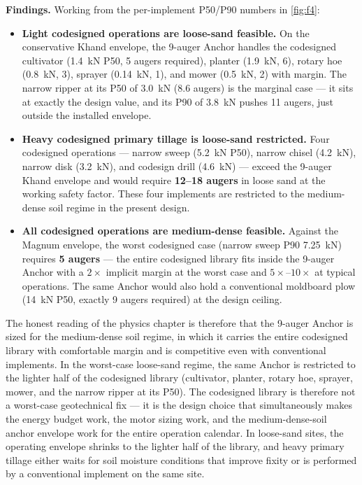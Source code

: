 \documentclass[11pt,a4paper]{article}
\begin{document}
\textbf{Findings.} Working from the per-implement P50/P90 numbers in \cref{fig:f4}:
\begin{itemize}[leftmargin=1.6em,itemsep=0.15em]
    \item \textbf{Light codesigned operations are loose-sand feasible.} On the conservative Khand envelope, the 9-auger Anchor handles the codesigned cultivator (\SI{1.4}{\kilo\newton} P50, 5 augers required), planter (\SI{1.9}{\kilo\newton}, 6), rotary hoe (\SI{0.8}{\kilo\newton}, 3), sprayer (\SI{0.14}{\kilo\newton}, 1), and mower (\SI{0.5}{\kilo\newton}, 2) with margin. The narrow ripper at its P50 of \SI{3.0}{\kilo\newton} (8.6 augers) is the marginal case --- it sits at exactly the design value, and its P90 of \SI{3.8}{\kilo\newton} pushes 11 augers, just outside the installed envelope.
    \item \textbf{Heavy codesigned primary tillage is loose-sand restricted.} Four codesigned operations --- narrow sweep (\SI{5.2}{\kilo\newton} P50), narrow chisel (\SI{4.2}{\kilo\newton}), narrow disk (\SI{3.2}{\kilo\newton}), and codesign drill (\SI{4.6}{\kilo\newton}) --- exceed the 9-auger Khand envelope and would require \textbf{12--18 augers} in loose sand at the working safety factor. These four implements are restricted to the medium-dense soil regime in the present design.
    \item \textbf{All codesigned operations are medium-dense feasible.} Against the Magnum envelope, the worst codesigned case (narrow sweep P90 \SI{7.25}{\kilo\newton}) requires \textbf{5 augers} --- the entire codesigned library fits inside the 9-auger Anchor with a $2\times$ implicit margin at the worst case and $5\times$--$10\times$ at typical operations. The same Anchor would also hold a conventional moldboard plow (\SI{14}{\kilo\newton} P50, exactly 9 augers required) at the design ceiling.
\end{itemize}

The honest reading of the physics chapter is therefore that the 9-auger Anchor is sized for the medium-dense soil regime, in which it carries the entire codesigned library with comfortable margin and is competitive even with conventional implements. In the worst-case loose-sand regime, the same Anchor is restricted to the lighter half of the codesigned library (cultivator, planter, rotary hoe, sprayer, mower, and the narrow ripper at its P50). The codesigned library is therefore not a worst-case geotechnical fix --- it is the design choice that simultaneously makes the energy budget work, the motor sizing work, and the medium-dense-soil anchor envelope work for the entire operation calendar. In loose-sand sites, the operating envelope shrinks to the lighter half of the library, and heavy primary tillage either waits for soil moisture conditions that improve fixity or is performed by a conventional implement on the same site.
\end{document}
